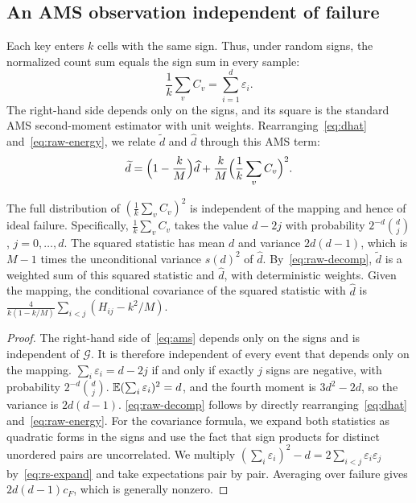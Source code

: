 \subsection{An AMS observation independent of failure}\label{app:ams}
Each key enters $k$ cells with the same sign. Thus, under random signs, the normalized count sum equals the sign sum in every sample:
\begin{equation}
\frac1k\sum_vC_v=\sum_{i=1}^d\varepsilon_i.\label{eq:ams}
\end{equation}
The right-hand side depends only on the signs, and its square is the standard AMS second-moment estimator with unit weights\cite{alon1999spacecomplexity}. Rearranging~\eqref{eq:dhat} and~\eqref{eq:raw-energy}, we relate $\widetilde d$ and $\widehat d$ through this AMS term:
\begin{equation}
\widetilde d=\Bigl(1-\frac kM\Bigr)\widehat d+\frac kM\Bigl(\frac1k\sum_vC_v\Bigr)^2.\label{eq:raw-decomp}
\end{equation}

\begin{proposition}\label{prop:ams}
The full distribution of $(\frac1k\sum_vC_v)^2$ is independent of the mapping and hence of ideal failure. Specifically, $\frac1k\sum_vC_v$ takes the value $d-2j$ with probability $2^{-d}\binom dj$, $j=0,\ldots,d$. The squared statistic has mean $d$ and variance $2d(d-1)$, which is $M-1$ times the unconditional variance $s(d)^2$ of $\widehat d$. By~\eqref{eq:raw-decomp}, $\widetilde d$ is a weighted sum of this squared statistic and $\widehat d$, with deterministic weights. Given the mapping, the conditional covariance of the squared statistic with $\widehat d$ is $\frac{4}{k(1-k/M)}\sum_{i<j}(H_{ij}-k^2/M)$.
\end{proposition}

\begin{proof}
The right-hand side of~\eqref{eq:ams} depends only on the signs and is independent of $\mathcal G$. It is therefore independent of every event that depends only on the mapping. $\sum_i\varepsilon_i=d-2j$ if and only if exactly $j$ signs are negative, with probability $2^{-d}\binom dj$. $\mathbb E(\sum_i\varepsilon_i)^2=d$, and the fourth moment is $3d^2-2d$, so the variance is $2d(d-1)$. \eqref{eq:raw-decomp} follows by directly rearranging~\eqref{eq:dhat} and~\eqref{eq:raw-energy}. For the covariance formula, we expand both statistics as quadratic forms in the signs and use the fact that sign products for distinct unordered pairs are uncorrelated. We multiply $(\sum_i\varepsilon_i)^2-d=2\sum_{i<j}\varepsilon_i\varepsilon_j$ by~\eqref{eq:rs-expand} and take expectations pair by pair. Averaging over failure gives $2d(d-1)c_F$, which is generally nonzero.
\end{proof}

